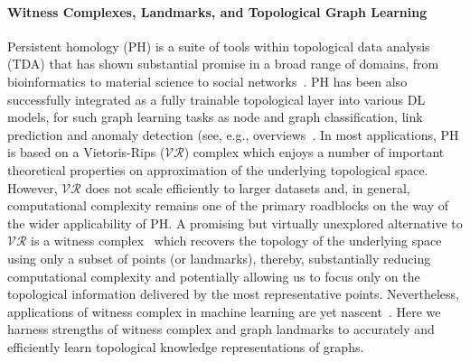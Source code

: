 \documentclass[letterpaper]{article} %
\begin{document}
\paragraph{Witness Complexes, Landmarks, and Topological Graph Learning}
Persistent homology (PH) is a suite of tools within topological data analysis (TDA) that has shown substantial promise in a broad range of domains, from bioinformatics to material science to social networks~\cite{otter2017roadmap,carlsson2020topological}. PH has been also successfully integrated as a fully trainable topological layer into various DL models, for such graph learning tasks as node and graph classification, %
link prediction %
and anomaly detection
(see, e.g., overviews~\citet{carlsson2020topological,tauzin2021giotto}.
In most applications, PH is based on a Vietoris-Rips ($\mathcal{VR}$) complex which enjoys a number of important theoretical properties on approximation of the underlying topological space. However, $\mathcal{VR}$ does not scale efficiently to larger datasets and, in general, computational complexity remains one of the primary roadblocks on the way of the wider applicability of PH. A promising but virtually unexplored  alternative to $\mathcal{VR}$ is a witness complex~\cite{de2004topological} which recovers the topology of the underlying space using only a subset of points (or landmarks), thereby, substantially reducing computational complexity and potentially allowing us to focus only on the topological information delivered by the most representative points. Nevertheless, applications of witness complex in machine learning are yet nascent~\cite{schonenberger2020witness, poklukar2021geomca}. Here we harness strengths of witness complex and graph landmarks to accurately and efficiently learn topological knowledge representations of graphs.
\end{document}
